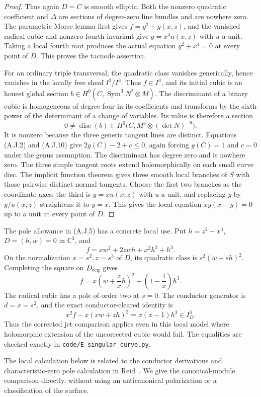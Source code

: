 \begin{proof}
Thus again $D=C$ is smooth elliptic. Both the nonzero
quadratic coefficient and $\Delta$ are sections of
degree-zero line bundles and are nowhere zero. The parametric
Morse lemma first gives $f=y^2+g(x,z)$, and the vanished
radical cubic and nonzero fourth invariant give
$g=x^4u(x,z)$ with $u$ a unit. Taking a local fourth root
produces the actual equation $y^2+x^4=0$ at every point of
$D$. This proves the tacnode assertion.

For an ordinary triple transversal, the quadratic class
vanishes generically, hence vanishes in the locally free
sheaf $I^2/I^3$. Thus $f\in I^3$, and its initial cubic
is an honest global section
$b\in H^0(C,\operatorname{Sym}^3N^*\otimes M)$.
The discriminant of a binary cubic is homogeneous of degree
four in its coefficients and transforms by the sixth power
of the determinant of a change of variables. Its value is
therefore a section
\[
 0\ne\operatorname{disc}(b)\in
 H^0\bigl(C,M^4\otimes(\det N)^{-6}\bigr).
                                                        \tag{A.J.10}
\]
It is nonzero because the three generic tangent lines are
distinct. Equations (A.J.2) and (A.J.10) give
$2g(C)-2+c\leq0$, again forcing $g(C)=1$ and $c=0$
under the genus assumption. The discriminant has degree
zero and is nowhere zero. The three simple tangent roots
extend holomorphically on each small curve disc. The implicit
function theorem gives three smooth local branches of $S$
with those pairwise distinct normal tangents. Choose the
first two branches as the coordinate axes; the third is
$y=xu(x,z)$ with $u$ a unit, and replacing $y$ by $y/u(x,z)$
straightens it to $y=x$. This gives the local equation
$xy(x-y)=0$ up to a unit at every point of $D$.
\end{proof}


The pole allowance in (A.J.5) has a concrete local use. Put
$h=z^2-x^3$, $D=(h,w)=0$ in $\mathbb C^3$, and
\[
 f=xw^2+2zwh+x^2h^2+h^3.
\]
On the normalization $x=s^2,z=s^3$ of $D$, its quadratic
class is $s^2(w+sh)^2$. Completing the square on $D_{\rm reg}$
gives
\[
 f=x\left(w+\frac zx h\right)^2+
                  \left(1-\frac1x\right)h^3.
\]
The radical cubic has a pole of order two at $s=0$.
The conductor generator is $d=x=s^2$, and the exact
conductor-cleared identity is
\[
 x^2f-x(xw+zh)^2=x(x-1)h^3\in I_D^3.
\]
Thus the corrected jet comparison applies even in this local
model where holomorphic extension of the uncorrected cubic
would fail. The equalities are checked exactly in
\texttt{code/E\_singular\_curve.py}.

The local calculation below is related to the conductor
derivations and characteristic-zero pole calculation in
Reid~\cite[\S3.9, \S4.4--4.8]{Reid1994Nonnormal}.
We give the canonical-module comparison directly, without
using an anticanonical polarization or a classification of
the surface.


